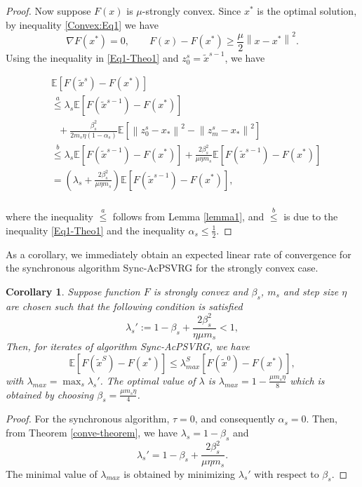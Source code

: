 \documentclass[letterpaper]{article} %
\newcommand*{\E}{\mathbb{E}}
\newcommand{\norm}[1]{\left\lVert#1\right\rVert}
\newtheorem{corollary}{Corollary}
\begin{document}
\begin{proof}
Now suppose $F(x)$ is $\mu$-strongly convex. Since $x^*$ is the optimal solution, by inequality \eqref{Convex:Eq1} we have 
\begin{equation}\label{Eq1-Theo1}
\nabla F(x^*) = 0,\qquad F(x)-F(x^*) \geq \frac{\mu}{2} \norm{x-x^*}^2.
\end{equation}
Using the inequality in \eqref{Eq1-Theo1} and $z_0^s = \widetilde{x}^{s-1}$, we have 

\begin{equation}
\begin{split}
&\E [F(\widetilde{x}^s)-F(x^*)]\\
&\stackrel{a}{\leq}\lambda_s\E[F(\widetilde{x}^{s-1})-F(x^*)]\\
&~~~+ {\frac{ \beta_s^2}{2 m_s\eta(1-\alpha_s)}}\E[\norm{z_{0}^s-x_*}^2-\norm{z_{m}^s-x_*}^2]\\
&\stackrel{b}{\leq}\lambda_s\E[F(\widetilde{x}^{s-1})-F(x^*)]+ {\frac{2  \beta_s^2}{\mu\eta m_s}}\E[F(\widetilde{x}^{s-1})-F(x^*)]\\
&=(\lambda_s+{\frac{2  \beta_s^2}{\mu\eta m_s}})\E[F(\widetilde{x}^{s-1})-F(x^*)],
\end{split}
\end{equation}\\
where the inequality $\stackrel{a}{\leq}$ follows from Lemma \ref{lemma1}, and $\stackrel{b}{\leq}$ is due to the inequality \eqref{Eq1-Theo1} and the inequality $\alpha_s\leq \frac{1}{2}$. 
\end{proof}
As a corollary, we immediately obtain an expected linear rate of convergence for the synchronous algorithm Sync-AcPSVRG for the strongly convex case.
\begin{corollary}\label{cor-syn}
Suppose function $F$ is strongly convex and $\beta_s$, $m_s$ and step size $\eta$ are chosen
such that the following condition is satisfied
\[
\lambda_s' := 1-\beta_s+{\frac{2\beta_s^2}{\eta\mu m_s}} < 1,
\]
Then, for iterates of algorithm Sync-AcPSVRG, we have
\begin{equation}
\E\left[F(\widetilde{x}^S)-F(x^*)\right]\leq \lambda_{max}^S\left[F(\widetilde{x}^0)-F(x^*)\right], 
\end{equation}
with $\lambda_{max} = \max_{s}{\lambda_s'}$. The optimal value of $\lambda$ is $\lambda_{max} = 1-\frac{\mu m_s\eta}{8}$ which is obtained by choosing ${\beta_s=\frac{\mu m_s\eta}{4}}$.
\end{corollary}
\begin{proof}
For the synchronous algorithm, $\tau=0$, and consequently $\alpha_s=0$. Then, from Theorem \ref{conve-theorem}, we have $\lambda_s = 1-\beta_s$ and 
\[
\lambda_s' = 1-\beta_s+{\frac{2  \beta_s^2}{\mu\eta m_s}}.\]
The minimal value of $\lambda_{max}$ is obtained by minimizing $\lambda_s'$ with respect to $\beta_s$.
\end{proof}
\end{document}
